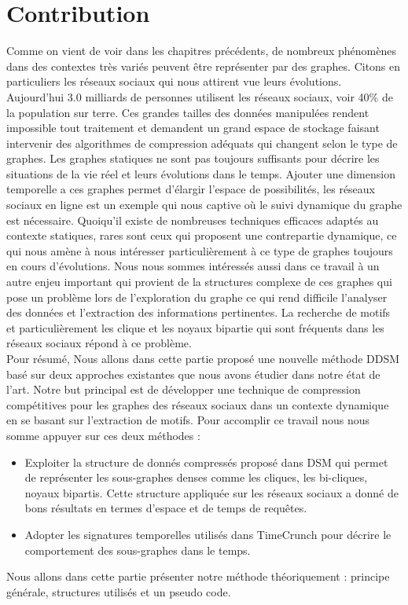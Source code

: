 \documentclass[a4paper,oneside,12pt]{report}
\theoremstyle{definition}
\begin{document}
	\chapter{Contribution}
		Comme on vient de voir dans les chapitres précédents, de nombreux phénomènes dans des contextes très variés peuvent être représenter par des graphes. Citons en particuliers les réseaux sociaux qui nous attirent vue leurs évolutions. Aujourd'hui 3.0 milliards de personnes utilisent les réseaux sociaux, voir 40\% de la population sur terre. Ces grandes tailles des données manipulées rendent impossible tout traitement et demandent un grand espace de stockage faisant intervenir des algorithmes de compression adéquats qui changent selon le type de graphes. Les graphes statiques ne sont pas toujours suffisants pour décrire les situations de la vie réel et leurs évolutions dans le temps. Ajouter une dimension temporelle a ces graphes permet d'élargir l'espace de possibilités, les réseaux sociaux en ligne est un exemple qui nous captive où le suivi dynamique du graphe est nécessaire. Quoiqu'il existe de nombreuses techniques efficaces adaptés au contexte statiques, rares sont ceux qui proposent une contrepartie dynamique, ce qui nous amène à nous intéresser particulièrement à ce type de graphes toujours en cours d'évolutions. Nous nous sommes intéressés aussi dans ce travail à un autre enjeu important qui provient de la structures complexe de ces graphes qui pose un problème lors de l'exploration du graphe ce qui rend difficile l'analyser des données et l'extraction des informations pertinentes. La recherche de motifs et particulièrement les clique et les noyaux bipartie qui sont fréquents dans les réseaux sociaux répond à ce problème.\\
Pour résumé, Nous allons dans cette partie proposé une nouvelle méthode DDSM basé sur deux approches existantes que nous avons étudier dans notre état de l'art. Notre but principal est de développer une technique de compression compétitives pour les graphes des réseaux sociaux dans un contexte dynamique en se basant sur l'extraction de motifs. Pour accomplir ce travail nous nous somme appuyer sur ces deux méthodes :
\begin{itemize}
\item Exploiter la structure de donnés compressés proposé dans DSM \citep{hernandez2014compressed} qui permet de représenter les sous-graphes denses comme les cliques, les bi-cliques, noyaux bipartis. Cette structure appliquée sur les réseaux sociaux a donné de bons résultats en termes d’espace et de temps de requêtes.  
\item Adopter les signatures temporelles utilisés dans TimeCrunch \citep{shah2015timecrunch} pour décrire le comportement des sous-graphes dans le temps.
\end{itemize}	
Nous allons dans cette partie présenter notre méthode théoriquement : principe générale, structures utilisés et un pseudo code.	
\end{document}
